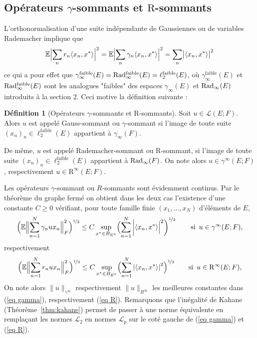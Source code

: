 \documentclass{smfart}
\theoremstyle{plain}
\theoremstyle{definition}
\newtheorem{definition}[theorem]{Définition}
\newcommand{\EE}{\mathbb E}
\newcommand {\FAIBLE} {\text{faible}}
\newcommand{\demi}{{\nicefrac{1}{2}}}
\newcommand{\err}{\mathrm{R}}
\newcommand {\RADbdd}{\text{\rm Rad}{}_\infty}
\newcommand {\GAUSSbdd} {\gamma_\infty}
\newcommand {\norm}[1] {\| #1 \|}               %
\newcommand {\ELL} {{\mathcal L}}
\begin{document}
\subsection{Opérateurs $\gamma$-sommants et $\err$-sommants}


\noindent L'orthonormalisation d'une suite indépendante de Gaussiennes
ou de variables Rademacher implique que
\[
   \EE \Bigl| \sum_n r_n \langle x_n, x^* \rangle \Bigr|^2 = \EE \Bigl| \sum_n \gamma_n \langle x_n, x^* \rangle \Bigr|^2 = \sum_n \bigl|\langle x_n, x^* \rangle\bigr|^2
\]
ce qui a pour effet que $\GAUSSbdd^\FAIBLE(E) = \RADbdd^\FAIBLE(E) =
\ell_2^\FAIBLE(E)$, o\`u $\GAUSSbdd^\FAIBLE(E)$ et  $\RADbdd^\FAIBLE(E)$ sont les analogues "faibles" des espaces $\GAUSSbdd(E)$ et  $\RADbdd(E)$ introduits à la section 2. Ceci motive la définition suivante :

\begin{definition}[Opérateurs $\gamma$-sommants et $\err$-sommants]\label{def:gamma-summing and R-summing}
  Soit $u \in {\mathcal L}(E; F)$. Alors $u$ est appelé Gauss-sommant ou
  $\gamma$-sommant si l'image de toute suite $(x_n)_n \in\ell_2^\FAIBLE(E)$
  appartient à $\GAUSSbdd(F)$.  

\smallskip

  \noindent De même, $u$ est appelé
  Rademacher-sommant ou $\err$-sommant, si l'image de toute suite
  $(x_n)_n \in \ell_2^\FAIBLE(E)$ appartient à $\RADbdd(F)$. On note alors $u \in
  \gamma^\infty(E; F)$, respectivement $u \in \err^\infty(E; F)$.
\end{definition}

\noindent Les opérateurs $\gamma$-sommant ou $R$-sommants
sont évidemment continus. Par le théorème du graphe fermé on obtient dans les
deux cas l'existence d'une constante $C\geq 0$ vérifiant, pour toute
famille finie $\left(x_1,\dots,x_N\right)$ d'éléments de $E$,
\begin{equation}\label{eq gamma} 
  \Bigl(\EE\Bigl\|\sum_{n=1}^N\gamma_n u x_n\Bigr\|_F^2\Bigr)^\demi\leq C \sup_{x^*\in B_{E^*}}\Bigl(\sum_{n=1}^N\left|\left\langle x_n ,x^*\right\rangle\Bigr|^2\right)^\demi
\qquad \text{si } \, u \in \gamma^\infty(E; F),
\end{equation}
respectivement
\begin{equation}\label{eq R} 
  \Bigl(\EE\Bigl\|\sum_{n=1}^N r_n u x_n\Bigr\|_F^2\Bigr)^\demi\leq C \sup_{x^*\in B_{E^*}}\Bigl(\sum_{n=1}^N\left|\left\langle x_n ,x^*\right\rangle\right|^2\Bigr)^\demi
\qquad \text{si } \, u \in \err^\infty(E; F),
\end{equation}
On note alors $\norm{ u }_{\gamma^\infty}$ respectivement $\norm{ u
}_{R^\infty}$ les meilleures constantes dans (\ref{eq gamma}),
respectivement (\ref{eq R}). Remarquons que l'inégalité de Kahane
(Théorème~\ref{thm:kahane}) permet de passer à une norme équivalente
en remplaçant les normes $\ELL_2$ en normes $\ELL_p$ sur le coté gauche de
(\ref{eq gamma}) et (\ref{eq R}).
\end{document}
